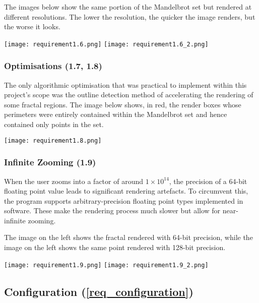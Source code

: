 The images below show the same portion of the Mandelbrot set but rendered at different resolutions. The lower the resolution, the quicker the image renders, but the worse it looks.

\FloatBarrier
\begin{figure*}[htp]
	\centering
	\texttt{[image: requirement1.6.png]}
	\texttt{[image: requirement1.6\_2.png]}
\end{figure*}
\FloatBarrier

\subsubsection{Optimisations (1.7, 1.8)}

The only algorithmic optimisation that was practical to implement within this project's scope was the outline detection method of accelerating the rendering of some fractal regions. The image below shows, in red, the render boxes whose perimeters were entirely contained within the Mandelbrot set and hence contained only points in the set.

\FloatBarrier
\begin{figure*}[htp]
	\centering
	\texttt{[image: requirement1.8.png]}
\end{figure*}
\FloatBarrier

\subsubsection{Infinite Zooming (1.9)}

When the user zooms into a factor of around $1 \times 10 ^{14}$, the precision of a 64-bit floating point value leads to significant rendering artefacts. To circumvent this, the program supports arbitrary-precision floating point types implemented in software. These make the rendering process much slower but allow for near-infinite zooming.

The image on the left shows the fractal rendered with 64-bit precision, while the image on the left shows the same point rendered with 128-bit precision.

\FloatBarrier
\begin{figure*}[htp]
	\centering
	\texttt{[image: requirement1.9.png]}
	\texttt{[image: requirement1.9\_2.png]}
\end{figure*}
\FloatBarrier


\subsection{Configuration (\ref{req_configuration})}


